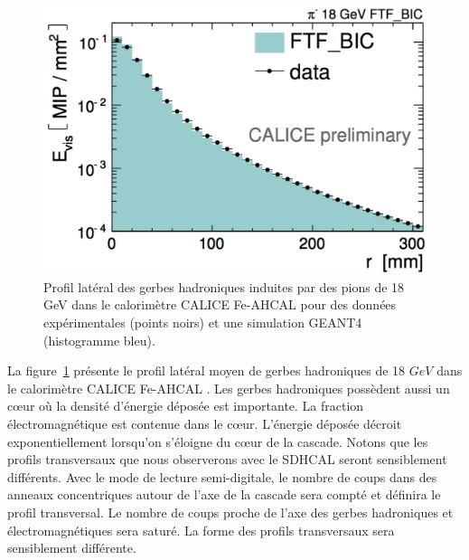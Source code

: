 \begin{figure}[!h]
  \begin{center}
    \includegraphics[width=.7\textwidth]{ShowerTh/figs/eudet_fig_11_rprof_18_FTF_BIC.pdf}
    \caption{Profil latéral des gerbes hadroniques induites par des pions de 18 GeV dans le calorimètre CALICE Fe-AHCAL pour des données expérimentales (points noirs) et une simulation GEANT4 (histogramme bleu).}
    \label{fig:tProfil_pi-}
  \end{center}
\end{figure}
La figure~\ref{fig:tProfil_pi-} présente le profil latéral moyen de gerbes hadroniques de 18 $GeV$ dans le calorimètre CALICE Fe-AHCAL \cite{ahcal_pi-_profil}. Les gerbes hadroniques possèdent aussi un cœur où la densité d'énergie déposée est importante. La fraction électromagnétique est contenue dans le cœur. L'énergie déposée décroit exponentiellement lorsqu'on s'éloigne du cœur de la cascade. Notons que les profils transversaux que nous observerons avec le SDHCAL seront sensiblement différents. Avec le mode de lecture semi-digitale, le nombre de coups dans des anneaux concentriques autour de l'axe de la cascade sera compté et définira le profil transversal. Le nombre de coups proche de l'axe des gerbes hadroniques et électromagnétiques sera saturé. La forme des profils transversaux sera sensiblement différente.

